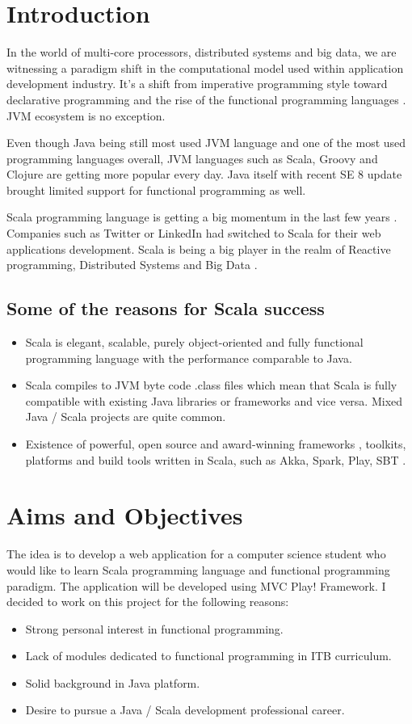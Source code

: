 \documentclass[12pt,twoside,a4paper]{report}
\begin{document}
\section{Introduction}\label{1.1}
In the world of multi-core processors, distributed systems and big data, we are witnessing a paradigm shift in the computational model used within application development industry. It's a shift from imperative programming style toward declarative programming and the rise of the functional programming languages \cite{1}. JVM ecosystem is no exception.\par
Even though Java being still most used JVM language and one of the most used programming languages overall, JVM languages such as Scala, Groovy and Clojure are getting more popular every day. Java itself with recent SE 8 update brought limited support for functional programming as well.\par
Scala programming language \cite{2} is getting a big momentum in the last few years \cite{3}. Companies such as Twitter or LinkedIn \cite{4} had switched to Scala for their web applications development. Scala is being a big player in the realm of Reactive programming, Distributed Systems and Big Data \cite{5}.

\subsection{Some of the reasons for Scala success}\label{1.1.1}
\begin{itemize}\itemsep1pt \parskip0pt 
\item Scala is elegant, scalable, purely object-oriented and fully functional programming language with the performance comparable to Java.
\item Scala compiles to JVM byte code .class files which mean that Scala is fully compatible with existing Java libraries or frameworks and vice versa. Mixed Java / Scala projects are quite common.
\item Existence of powerful, open source and award-winning frameworks \cite{6}, toolkits, platforms and build tools written in Scala, such as Akka, Spark, Play, SBT \cite{7}.
\end{itemize}
\section{Aims and Objectives}\label{1.2}
The idea is to develop a web application for a computer science student who would like to learn Scala programming language and functional programming paradigm. The application will be developed using MVC Play! Framework. I decided to work on this project for the following reasons:
\begin{itemize}\itemsep1pt \parskip0pt 
\item Strong personal interest in functional programming.
\item Lack of modules dedicated to functional programming in ITB curriculum.
\item Solid background in Java platform.
\item Desire to pursue a Java / Scala development professional career.
\end{itemize}
\end{document}
